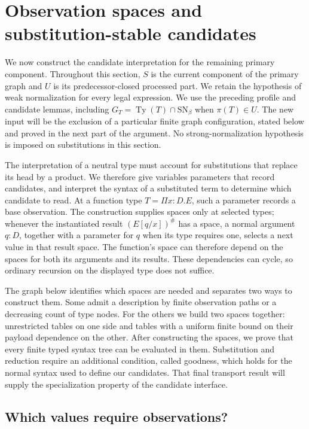 \section{Observation spaces and substitution-stable candidates}
\label{obs:section}

We now construct the candidate interpretation for the remaining primary
component.  Throughout this section, $S$ is the current component of the
primary graph and $U$ is its predecessor-closed processed part.  We retain
the hypothesis of weak normalization for every legal expression.  We use
the preceding profile and candidate lemmas, including
$G_T=\operatorname{Ty}(T)\cap\mathrm{SN}_\beta$ when $\pi(T)\in U$.
The new input will be the exclusion of a particular finite graph
configuration, stated below and proved in the next part of the argument.
No strong-normalization hypothesis is imposed on substitutions in this
section.

The interpretation of a neutral type must account for substitutions
that replace its head by a product.  We therefore give variables parameters
that record candidates, and interpret the syntax of a substituted term
to determine which candidate to read.  At a function type
$T=\Pi x:D.E$, such a parameter records a base observation.  The
construction supplies spaces only at selected types; whenever the
instantiated result $(E[q/x])^\#$ has a space, a normal argument
$q:D$, together with a parameter for $q$ when its type requires one,
selects a next value in that result space.  The function's space can
therefore depend on the spaces for both its arguments and its results.  These dependencies
can cycle, so ordinary recursion on the displayed type does not suffice.

The graph below identifies which spaces are needed and separates two
ways to construct them.  Some admit a description by finite observation
paths or a decreasing count of type nodes.  For the others we build two
spaces together: unrestricted tables on one side and tables with a
uniform finite bound on their payload dependence on the other.  After
constructing the spaces, we prove that every finite typed syntax tree
can be evaluated in them.  Substitution and reduction require an
additional condition, called goodness, which holds for the normal
syntax used to define our candidates.  That final transport result will
supply the specialization property of
the candidate interface.

\subsection{Which values require observations?}
\label{obs:graphs}

